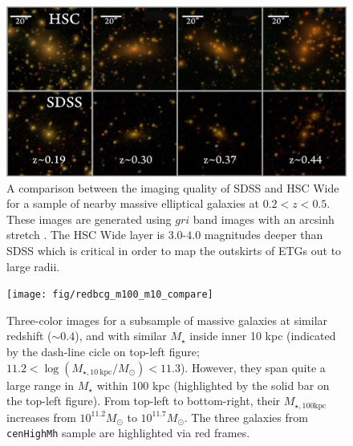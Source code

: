 \documentclass{emulateapj}
\def\rbcg{\texttt{cenHighMh}}
\def\mstar{{$M_{\star}$}}
\def\mtot{{$M_{\star,100\mathrm{kpc}}$}}
\begin{document}
\begin{CJK*}{UTF8}{gbsn}
\begin{abstract}
\end{abstract}

\maketitle


    \begin{figure}[t!]
        \centering 
        \includegraphics[width=\textwidth]{fig/redbcg_sdss_compare}
        \caption{A comparison between the imaging quality of SDSS and HSC Wide for a sample 
        	of nearby massive elliptical galaxies at $0.2 < z < 0.5$.  
            These images are generated using $gri$ band images with an arcsinh stretch 
            \citep{Lupton2004}. 
            The HSC Wide layer is $3.0$-$4.0$ magnitudes deeper than SDSS which is 
            critical in order to map the outskirts of ETGs out to large radii.}
        \label{fig:sdss_compare}
    \end{figure}

  \begin{figure}[t!]
      \centering 
      \texttt{[image: fig/redbcg\_m100\_m10\_compare]}
      \caption{Three-color images for a subsample of massive galaxies at similar redshift
      		($\sim 0.4$), and with similar \mstar{} inside inner 10 kpc (indicated by the 
            dash-line cicle on top-left figure; 
            $11.2<\log (M_{\star,10\ \mathrm{kpc}}/M_{\odot})<11.3$). 
            However, they span quite a large range in \mstar{} within 100 kpc 
            (highlighted by the solid bar on the top-left figure). 
            From top-left to bottom-right, their \mtot{} increases from 
            $10^{11.2} M_{\odot}$ to $10^{11.7} M_{\odot}$.
            The three galaxies from \rbcg{} sample are highlighted via red frames.
            }
      \label{fig:m100_m10_color}
  \end{figure}


\end{CJK*}
\end{document}
